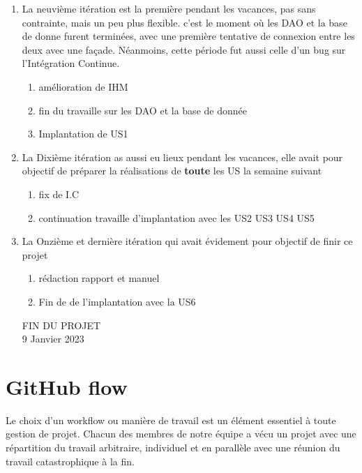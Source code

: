 \documentclass[a4paper,french,final]{memoir}
\begin{document}
\begin{enumerate}[label=\textbf{Itération~n\kern-0.5bp\textsuperscript{o}~\arabic*:},start=0]
    \item La neuvième itération est la première pendant les vacances, pas sans contrainte, mais un peu plus
    flexible. c'est le moment où les DAO et la base de donne furent terminées, avec une première tentative
    de connexion entre les deux avec une façade. Néanmoins, cette période fut aussi celle d'un bug sur
    l'Intégration Continue.
    \begin{enumerate}
        \item [\ding{51}] amélioration de IHM
        \item [\ding{51}] fin du travaille sur les DAO et la base de donnée
        \item [\ding{51}] Implantation de US1
    \end{enumerate}
    
    \item La Dixième itération as aussi eu lieux pendant les vacances, elle avait pour objectif de préparer la
    réalisations de \textbf{toute} les US la semaine suivant
    \begin{enumerate}
        \item [\ding{51}] fix de I.C
        \item [\ding{51}] continuation travaille d'implantation avec les US2 US3 US4
        US5
    \end{enumerate}
    
    \item La Onzième et dernière itération qui avait évidement pour objectif de finir ce projet
    \begin{enumerate}
        \item [\ding{51}] rédaction rapport et manuel
        \item [\ding{51}] Fin de de l'implantation avec la US6
    \end{enumerate}
    \begin{center}
        \begin{Large}
            FIN DU PROJET\\9 Janvier 2023
        \end{Large}
    \end{center}
    
    
\end{enumerate}
\section{GitHub flow}
Le choix d'un workflow ou manière de travail est un élément essentiel à toute gestion de projet. Chacun des membres de notre équipe
a vécu un projet avec une répartition du travail arbitraire, individuel et en parallèle avec une réunion du travail catastrophique à la fin.
\end{document}
